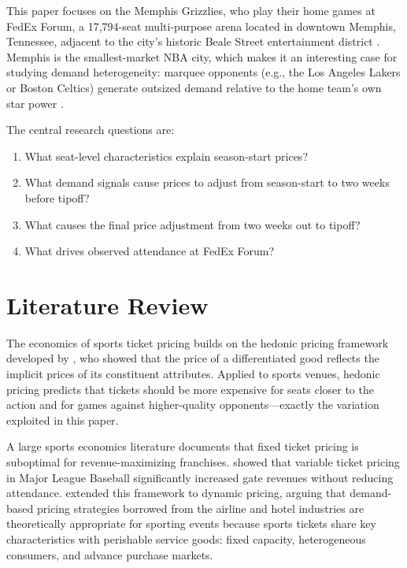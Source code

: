 \documentclass[12pt]{article}
\begin{document}
This paper focuses on the Memphis Grizzlies, who play their home games at FedEx Forum, a 17,794-seat multi-purpose arena located in downtown Memphis, Tennessee, adjacent to the city's historic Beale Street entertainment district \citep{fedexforum2024about}. Memphis is the smallest-market NBA city, which makes it an interesting case for studying demand heterogeneity: marquee opponents (e.g., the Los Angeles Lakers or Boston Celtics) generate outsized demand relative to the home team's own star power \citep{grizzlies2024nba}.
 
The central research questions are:
\begin{enumerate}
    \item What seat-level characteristics explain season-start prices?
    \item What demand signals cause prices to adjust from season-start to two weeks before tipoff?
    \item What causes the final price adjustment from two weeks out to tipoff?
    \item What drives observed attendance at FedEx Forum?
\end{enumerate}
 
 
\section{Literature Review}
\label{sec:litreview}
 
The economics of sports ticket pricing builds on the hedonic pricing framework developed by \citet{rosen1974hedonic}, who showed that the price of a differentiated good reflects the implicit prices of its constituent attributes. Applied to sports venues, hedonic pricing predicts that tickets should be more expensive for seats closer to the action and for games against higher-quality opponents---exactly the variation exploited in this paper.
 
A large sports economics literature documents that fixed ticket pricing is suboptimal for revenue-maximizing franchises. \citet{rascher2007variable} showed that variable ticket pricing in Major League Baseball significantly increased gate revenues without reducing attendance. \citet{drayer2012dynamic} extended this framework to dynamic pricing, arguing that demand-based pricing strategies borrowed from the airline and hotel industries are theoretically appropriate for sporting events because sports tickets share key characteristics with perishable service goods: fixed capacity, heterogeneous consumers, and advance purchase markets.
 
\end{document}

